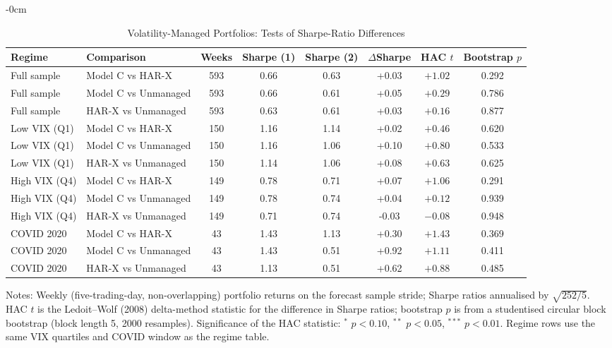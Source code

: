 
\begin{table}[htbp]
\begin{adjustwidth}{-\extralength}{0cm}
\centering
\caption{Volatility-Managed Portfolios: Tests of Sharpe-Ratio Differences}
\label{tab:sharpe_tests}
\footnotesize
\setlength{\tabcolsep}{4pt}
\begin{tabular}{llcccccc}
\toprule
Regime & Comparison & Weeks & Sharpe (1) & Sharpe (2) & $\Delta$Sharpe & HAC $t$ & Bootstrap $p$ \\
\midrule
Full sample & Model C vs HAR-X & 593 & 0.66 & 0.63 & +0.03 & $+1.02$ & 0.292 \\
Full sample & Model C vs Unmanaged & 593 & 0.66 & 0.61 & +0.05 & $+0.29$ & 0.786 \\
Full sample & HAR-X vs Unmanaged & 593 & 0.63 & 0.61 & +0.03 & $+0.16$ & 0.877 \\
Low VIX (Q1) & Model C vs HAR-X & 150 & 1.16 & 1.14 & +0.02 & $+0.46$ & 0.620 \\
Low VIX (Q1) & Model C vs Unmanaged & 150 & 1.16 & 1.06 & +0.10 & $+0.80$ & 0.533 \\
Low VIX (Q1) & HAR-X vs Unmanaged & 150 & 1.14 & 1.06 & +0.08 & $+0.63$ & 0.625 \\
High VIX (Q4) & Model C vs HAR-X & 149 & 0.78 & 0.71 & +0.07 & $+1.06$ & 0.291 \\
High VIX (Q4) & Model C vs Unmanaged & 149 & 0.78 & 0.74 & +0.04 & $+0.12$ & 0.939 \\
High VIX (Q4) & HAR-X vs Unmanaged & 149 & 0.71 & 0.74 & -0.03 & $-0.08$ & 0.948 \\
COVID 2020 & Model C vs HAR-X & 43 & 1.43 & 1.13 & +0.30 & $+1.43$ & 0.369 \\
COVID 2020 & Model C vs Unmanaged & 43 & 1.43 & 0.51 & +0.92 & $+1.11$ & 0.411 \\
COVID 2020 & HAR-X vs Unmanaged & 43 & 1.13 & 0.51 & +0.62 & $+0.88$ & 0.485 \\
\bottomrule
\end{tabular}
\begin{tablenotes}\small
\item Notes: Weekly (five-trading-day, non-overlapping) portfolio returns on the forecast sample stride; Sharpe ratios annualised by $\sqrt{252/5}$. HAC $t$ is the Ledoit--Wolf (2008) delta-method statistic for the difference in Sharpe ratios; bootstrap $p$ is from a studentised circular block bootstrap (block length 5, 2000 resamples). Significance of the HAC statistic: $^{*}$ $p<0.10$, $^{**}$ $p<0.05$, $^{***}$ $p<0.01$. Regime rows use the same VIX quartiles and COVID window as the regime table.
\end{tablenotes}
\end{adjustwidth}
\end{table}
